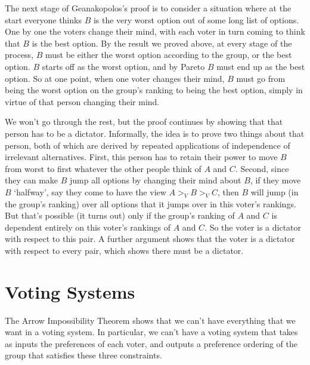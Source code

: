 \begin{multicols}{2}
The next stage of Geanakopolos's proof is to consider a situation where at the start everyone thinks $B$ is the very worst option out of some long list of options. One by one the voters change their mind, with each voter in turn coming to think that $B$ is the best option. By the result we proved above, at every stage of the process, $B$ must be either the worst option according to the group, or the best option. $B$ starts off as the worst option, and by Pareto $B$ must end up as the best option. So at one point, when one voter changes their mind, $B$ must go from being the worst option on the group's ranking to being the best option, simply in virtue of that person changing their mind.

We won't go through the rest, but the proof continues by showing that that person has to be a dictator. Informally, the idea is to prove two things about that person, both of which are derived by repeated applications of independence of irrelevant alternatives. First, this person has to retain their power to move $B$ from worst to first whatever the other people think of $A$ and $C$. Second, since they can make $B$ jump all options by changing their mind about $B$, if they move $B$ `halfway', say they come to have the view $A >_V B >_V C$, then $B$ will jump (in the group's ranking) over all options that it jumps over in this voter's rankings. But that's possible (it turns out) only if the group's ranking of $A$ and $C$ is dependent entirely on this voter's rankings of $A$ and $C$. So the voter is a dictator with respect to this pair. A further argument shows that the voter is a dictator with respect to every pair, which shows there must be a dictator.

\section{Voting Systems}

The Arrow Impossibility Theorem shows that we can't have everything that we want in a voting system. In particular, we can't have a voting system that takes as inputs the preferences of each voter, and outputs a preference ordering of the group that satisfies these three constraints.


\end{multicols}
